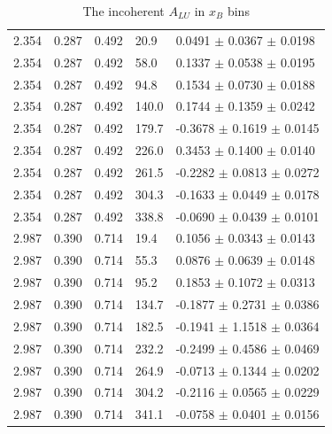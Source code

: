 \begin{table}[!h]
\begin{center}
\begin{tabular}{||l|l|l|l|l||}
  2.354 & 0.287 & 0.492 & 20.9  &  0.0491   $\pm$   0.0367   $\pm$   0.0198  \\
  2.354 & 0.287 & 0.492 & 58.0  &  0.1337   $\pm$   0.0538   $\pm$   0.0195  \\
  2.354 & 0.287 & 0.492 & 94.8  &  0.1534   $\pm$   0.0730   $\pm$   0.0188  \\
  2.354 & 0.287 & 0.492 & 140.0 &  0.1744   $\pm$   0.1359   $\pm$   0.0242  \\
  2.354 & 0.287 & 0.492 & 179.7 & -0.3678   $\pm$   0.1619   $\pm$   0.0145  \\
  2.354 & 0.287 & 0.492 & 226.0 &  0.3453   $\pm$   0.1400   $\pm$   0.0140  \\
  2.354 & 0.287 & 0.492 & 261.5 & -0.2282   $\pm$   0.0813   $\pm$   0.0272  \\
  2.354 & 0.287 & 0.492 & 304.3 & -0.1633   $\pm$   0.0449   $\pm$   0.0178  \\
  2.354 & 0.287 & 0.492 & 338.8 & -0.0690   $\pm$   0.0439   $\pm$   0.0101  \\
 \hline                                                                        
  2.987 & 0.390 & 0.714 & 19.4  &  0.1056   $\pm$   0.0343   $\pm$   0.0143  \\
  2.987 & 0.390 & 0.714 & 55.3  &  0.0876   $\pm$   0.0639   $\pm$   0.0148  \\
  2.987 & 0.390 & 0.714 & 95.2  &  0.1853   $\pm$   0.1072   $\pm$   0.0313  \\
  2.987 & 0.390 & 0.714 & 134.7 & -0.1877   $\pm$   0.2731   $\pm$   0.0386  \\
  2.987 & 0.390 & 0.714 & 182.5 & -0.1941   $\pm$   1.1518   $\pm$   0.0364  \\
  2.987 & 0.390 & 0.714 & 232.2 & -0.2499   $\pm$   0.4586   $\pm$   0.0469  \\
  2.987 & 0.390 & 0.714 & 264.9 & -0.0713   $\pm$   0.1344   $\pm$   0.0202  \\
  2.987 & 0.390 & 0.714 & 304.2 & -0.2116   $\pm$   0.0565   $\pm$   0.0229  \\
  2.987 & 0.390 & 0.714 & 341.1 & -0.0758   $\pm$   0.0401   $\pm$   0.0156  \\

         \hline
 \hline
 \end{tabular}
 \caption{The incoherent $A_{LU}$ in $x_B$ bins}
 \label{table:InCoh_xB_BSA}
 \end{center}
\end{table}



